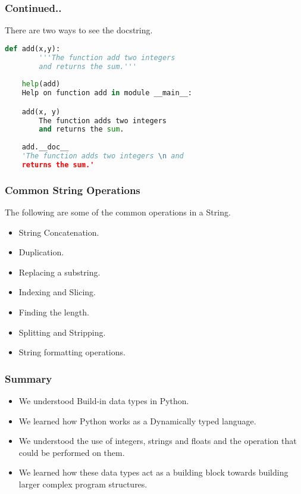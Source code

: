 \documentclass{beamer}
\begin{document}
\begin{frame}[fragile]
\frametitle{Continued..}
There are two ways to see the docstring.

\begin{lstlisting}[language=Python]
	def add(x,y):
		'''The function add two integers
		and returns the sum.'''
	 
	help(add)
	Help on function add in module __main__:

	add(x, y)
    	The function adds two integers 
    	and returns the sum.
    	
    add.__doc__
    'The function adds two integers \n and 
    returns the sum.'
\end{lstlisting}
\end{frame}

\begin{frame}
\frametitle{Common String Operations}
The following are some of the common operations in a String.
\begin{itemize}
\item String Concatenation.
\item Duplication.
\item Replacing a substring.
\item Indexing and Slicing.
\item Finding the length.
\item Splitting and Stripping.
\item String formatting operations.
\end{itemize}
\end{frame}

\begin{frame}
\frametitle{Summary}
\begin{itemize}
\item We understood Build-in data types in Python.
\item We learned how Python works as a Dynamically typed language.
\item We understood the use of integers, strings and floats and the operation that could be performed on them.
\item We learned how these data types act as a building block towards building larger complex program structures. 
\end{itemize}
\end{frame}
\end{document}
